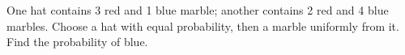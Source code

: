 One hat contains 3 red and 1 blue marble; another contains 2 red and 4 blue marbles. Choose a hat with equal probability, then a marble uniformly from it. Find the probability of blue.
